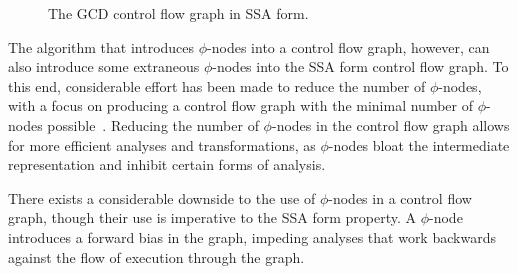 \begin{figure}[ht]
  \centering
  \caption[The GCD control flow graph in SSA form.]{The GCD control flow graph in SSA form.~\cite{gange2015horn}}
  \label{fig:lit-review--gcd-ssa}
\end{figure}
 
The algorithm that introduces $\phi$-nodes into a control flow graph, however, can also introduce some extraneous $\phi$-nodes into the SSA form control flow graph. To this end, considerable effort has been made to reduce the number of $\phi$-nodes, with a focus on producing a control flow graph with the minimal number of $\phi$-nodes possible~\cite{cooper2001simple, braun2013simple}. Reducing the number of $\phi$-nodes in the control flow graph allows for more efficient analyses and transformations, as $\phi$-nodes bloat the intermediate representation and inhibit certain forms of analysis.

There exists a considerable downside to the use of $\phi$-nodes in a control flow graph, though their use is imperative to the SSA form property. A $\phi$-node introduces a forward bias in the graph, impeding analyses that work backwards against the flow of execution through the graph.

